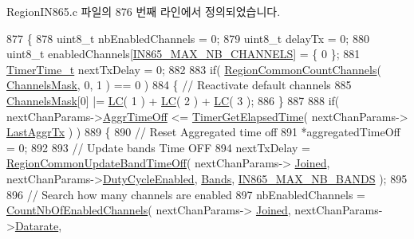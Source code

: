 Region\+I\+N865.\+c 파일의 876 번째 라인에서 정의되었습니다.


\begin{DoxyCode}
877 \{
878     uint8\_t nbEnabledChannels = 0;
879     uint8\_t delayTx = 0;
880     uint8\_t enabledChannels[\mbox{\hyperlink{group___r_e_g_i_o_n_i_n865_ga6fbcf463cb8df05984d576d96383651d}{IN865\_MAX\_NB\_CHANNELS}}] = \{ 0 \};
881     \mbox{\hyperlink{utilities_8h_a4215ca43d3e953099ea758ce428599d0}{TimerTime\_t}} nextTxDelay = 0;
882 
883     \textcolor{keywordflow}{if}( \mbox{\hyperlink{group___r_e_g_i_o_n_c_o_m_m_o_n_gac23f0831812f610f57f42f6cf87368c9}{RegionCommonCountChannels}}( \mbox{\hyperlink{_region_i_n865_8c_a2188957b5ca6af8092154d7ccbfa5757}{ChannelsMask}}, 0, 1 ) == 0 )
884     \{ \textcolor{comment}{// Reactivate default channels}
885         \mbox{\hyperlink{_region_i_n865_8c_a2188957b5ca6af8092154d7ccbfa5757}{ChannelsMask}}[0] |= \mbox{\hyperlink{group___r_e_g_i_o_n_ga12fa17e5c1016e01a9d82c25027deb1b}{LC}}( 1 ) + \mbox{\hyperlink{group___r_e_g_i_o_n_ga12fa17e5c1016e01a9d82c25027deb1b}{LC}}( 2 ) + \mbox{\hyperlink{group___r_e_g_i_o_n_ga12fa17e5c1016e01a9d82c25027deb1b}{LC}}( 3 );
886     \}
887 
888     \textcolor{keywordflow}{if}( nextChanParams->\mbox{\hyperlink{structs_next_chan_params_a3609676d2d3b7c00e25615324b35cb26}{AggrTimeOff}} <= \mbox{\hyperlink{time_server_8c_a9ca7e27f3d6474daff63f2e093a2e91e}{TimerGetElapsedTime}}( nextChanParams->
      \mbox{\hyperlink{structs_next_chan_params_a381b728f60b185ecf3313e974c18768b}{LastAggrTx}} ) )
889     \{
890         \textcolor{comment}{// Reset Aggregated time off}
891         *aggregatedTimeOff = 0;
892 
893         \textcolor{comment}{// Update bands Time OFF}
894         nextTxDelay = \mbox{\hyperlink{group___r_e_g_i_o_n_c_o_m_m_o_n_ga2e26fe6b49ca26edf7052eadd7f18b3a}{RegionCommonUpdateBandTimeOff}}( nextChanParams->
      \mbox{\hyperlink{structs_next_chan_params_ac2f6caa0f3b02d2ac5056c3ee7c22652}{Joined}}, nextChanParams->\mbox{\hyperlink{structs_next_chan_params_a4d755868e0e80089462286c3ba6a6f18}{DutyCycleEnabled}}, \mbox{\hyperlink{_region_i_n865_8c_a9250eb5b8133c0d3c631dee6283deb17}{Bands}}, 
      \mbox{\hyperlink{group___r_e_g_i_o_n_i_n865_ga0cb9f2d2f0224a649a6e53522acb2ad6}{IN865\_MAX\_NB\_BANDS}} );
895 
896         \textcolor{comment}{// Search how many channels are enabled}
897         nbEnabledChannels = \mbox{\hyperlink{_region_i_n865_8c_a84ed01aa0ea6f1e53707efb5aaa3bd97}{CountNbOfEnabledChannels}}( nextChanParams->
      \mbox{\hyperlink{structs_next_chan_params_ac2f6caa0f3b02d2ac5056c3ee7c22652}{Joined}}, nextChanParams->\mbox{\hyperlink{structs_next_chan_params_ae2f6080f3aa0e9485c55513ca56bb24d}{Datarate}},

\end{DoxyCode}
